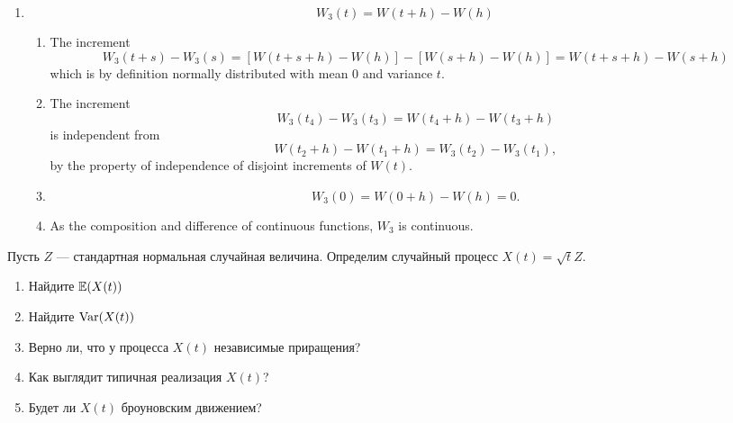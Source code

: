 \begin{problem}
\begin{sol}
\begin{enumerate}
  \item
  \[
      W_3(t) = W(t+h) - W(h)
  \]
  \begin{enumerate}
    \item
    The increment
    \[
        W_3(t+s) - W_3(s) = [ W(t+s+h) - W(h) ] - [ W(s+h) -
        W(h) ] = W(t+s+h) - W(s+h)
    \]
    which is by definition normally distributed with mean $
    0 $ and variance $ t $.

    \item
    The increment
    \[
        W_3(t_4) - W_3(t_3) = W(t_4+h) - W(t_3+h)
    \]
    is independent from
    \[
        W(t_2+h) - W(t_1+h) = W_3(t_2) - W_3(t_1),
    \]
    by the property of independence of disjoint increments
    of $ W(t) $.

    \item
    \[
        W_3(0) = W(0+h) - W(h) = 0.
    \]

    \item
    As the composition and difference of continuous
    functions, $ W_3 $ is continuous.
    \end{enumerate}
  \end{enumerate}

\end{sol}
\end{problem}

\begin{problem}
Пусть $Z$ — стандартная нормальная случайная величина. Определим случайный процесс $X(t)=\sqrt{t}Z$.
\begin{enumerate}
\item  Найдите $\mathbb{E}(X(t))$
\item Найдите $\operatorname{Var}(X(t))$
\item Верно ли, что у процесса $X(t)$ независимые приращения?
\item Как выглядит типичная реализация $X(t)$?
\item Будет ли $X(t)$ броуновским движением?
\end{enumerate}

\begin{sol}
\end{sol}
\end{problem}




